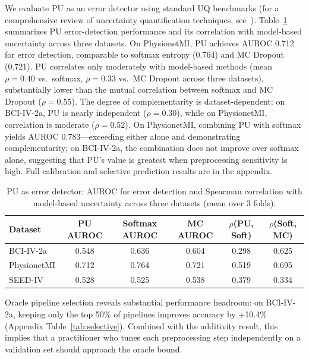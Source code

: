 \documentclass{article}
\begin{document}
We evaluate PU as an error detector using standard UQ benchmarks (for a comprehensive review of uncertainty quantification techniques, see~\citet{abdar2021review}). Table~\ref{tab:pu} summarizes PU error-detection performance and its correlation with model-based uncertainty across three datasets. On PhysionetMI, PU achieves AUROC 0.712 for error detection, comparable to softmax entropy (0.764) and MC Dropout (0.721). PU correlates only moderately with model-based methods (mean $\rho{=}0.40$ vs.\ softmax, $\rho{=}0.33$ vs.\ MC Dropout across three datasets), substantially lower than the mutual correlation between softmax and MC Dropout ($\rho{=}0.55$). The degree of complementarity is dataset-dependent: on BCI-IV-2a, PU is nearly independent ($\rho{=}0.30$), while on PhysionetMI, correlation is moderate ($\rho{=}0.52$). On PhysionetMI, combining PU with softmax yields AUROC 0.783---exceeding either alone and demonstrating complementarity; on BCI-IV-2a, the combination does not improve over softmax alone, suggesting that PU's value is greatest when preprocessing sensitivity is high. Full calibration and selective prediction results are in the appendix.

\begin{table}[t]
\centering
\caption{PU as error detector: AUROC for error detection and Spearman correlation with model-based uncertainty across three datasets (mean over 3 folds).}
\label{tab:pu}
\small
\begin{tabular}{@{}lccccc@{}}
\toprule
Dataset & PU AUROC & Softmax AUROC & MC AUROC & $\rho$(PU, Soft) & $\rho$(Soft, MC) \\
\midrule
BCI-IV-2a & 0.548 & 0.636 & 0.604 & 0.298 & 0.625 \\
PhysionetMI & 0.712 & 0.764 & 0.721 & 0.519 & 0.695 \\
SEED-IV & 0.528 & 0.525 & 0.538 & 0.379 & 0.334 \\
\bottomrule
\end{tabular}
\end{table}

Oracle pipeline selection reveals substantial performance headroom: on BCI-IV-2a, keeping only the top 50\% of pipelines improves accuracy by +10.4\% (Appendix Table~\ref{tab:selective}). Combined with the additivity result, this implies that a practitioner who tunes each preprocessing step independently on a validation set should approach the oracle bound.


\end{document}
